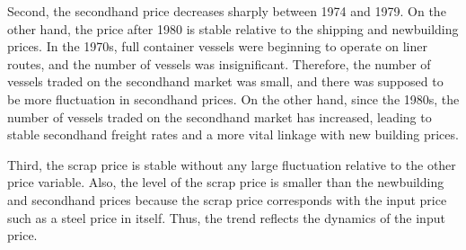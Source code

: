 \documentclass[11pt]{article}
\begin{document}
Second, the secondhand price decreases sharply between 1974 and 1979. On the other hand, the price after 1980 is stable relative to the shipping and newbuilding prices. In the 1970s, full container vessels were beginning to operate on liner routes, and the number of vessels was insignificant. Therefore, the number of vessels traded on the secondhand market was small, and there was supposed to be more fluctuation in secondhand prices. On the other hand, since the 1980s, the number of vessels traded on the secondhand market has increased, leading to stable secondhand freight rates and a more vital linkage with new building prices.

Third, the scrap price is stable without any large fluctuation relative to the other price variable. Also, the level of the scrap price is smaller than the newbuilding and secondhand prices because the scrap price corresponds with the input price such as a steel price in itself. Thus, the trend reflects the dynamics of the input price.


\end{document}
